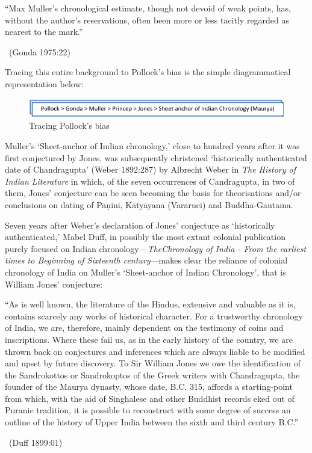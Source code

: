 \begin{myquote}
“Max Muller’s chronological estimate, though not devoid of weak points, has, without the author’s reservations, often been more or less tacitly regarded as nearest to the mark.” 

~\hfill (Gonda 1975:22)
\end{myquote}

Tracing this entire background to Pollock’s bias is the simple diagrammatical representation below:

\begin{figure}[!h]
\includegraphics[scale=.45]{images/chap1-fig1.jpg}
\caption{Tracing Pollock’s bias}\label{chap1-fig1}
\end{figure}

Muller’s ‘Sheet-anchor of Indian chronology,’ close to hundred years after it was first conjectured by Jones, was subsequently christened ‘historically authenticated date of Chandragupta’ (Weber 1892:287) by Albrecht Weber in \textit{The History of Indian Literature} in which, of the seven occurrences of Candragupta, in two of them, Jones’ conjecture can be seen becoming the basis for theorisations and/or conclusions on dating of Pāṇini, Kātyāyana (Vararuci) and Buddha-Gautama.

Seven years after Weber’s declaration of Jones’ conjecture as ‘historically authenticated,’ Mabel Duff, in possibly the most extant colonial publication purely focused on Indian chronology—\textit{The}\textit{Chronology of India - From the earliest times to Beginning of Sixteenth century}—makes clear the reliance of colonial chronology of India on Muller’s ‘Sheet-anchor of Indian Chronology’, that is William Jones’ conjecture:

\begin{myquote}
“As is well known, the literature of the Hindus, extensive and valuable as it is, contains scarcely any works of historical character. For a trustworthy chronology of India, we are, therefore, mainly dependent on the testimony of coins and inscriptions. Where these fail us, as in the early history of the country, we are thrown back on conjectures and inferences which are always liable to be modified and upset by future discovery. To Sir William Jones we owe the identification of the Sandrokottos or Sandrokoptos of the Greek writers with Chandragupta, the founder of the Maurya dynasty, whose date, B.C. 315, affords a starting-point from which, with the aid of Singhalese and other Buddhist records eked out of Puranic tradition, it is possible to reconstruct with some degree of success an outline of the history of Upper India between the sixth and third century B.C.” 

~\hfill (Duff 1899:01)
\end{myquote}

